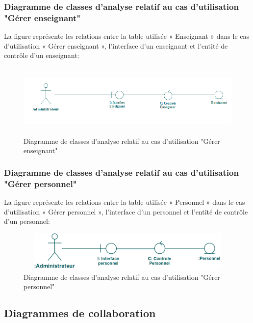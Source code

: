 \documentclass[12 pt]{report}
\begin{document}
\subsubsection{Diagramme de classes d’analyse relatif au cas d’utilisation "Gérer enseignant" }
La figure  représente les relations entre la table utilisée « Enseignant » dans le cas d’utilisation « Gérer enseignant », l’interface d'un enseignant et  l'entité de  contrôle d'un enseignant:
\begin{figure}[h]
\begin{center}
\includegraphics[width= 12cm , height =3.6cm]{cl_aj.png}
\caption{Diagramme de classes d’analyse relatif au cas d’utilisation "Gérer enseignant"}
\end{center}
\end{figure}
\subsubsection{Diagramme de classes d’analyse relatif au cas d’utilisation "Gérer personnel" }
La figure  représente les relations entre la table utilisée « Personnel » dans le cas d’utilisation « Gérer personnel », l’interface d'un personnel et  l'entité de  contrôle d'un personnel:
\begin{figure}[h]
\begin{center}
\includegraphics[width= 12cm , height =2cm]{cap.png}
\caption{Diagramme de classes d’analyse relatif au cas d’utilisation "Gérer personnel"}
\end{center}
\end{figure}
\subsection{Diagrammes de collaboration }
\end{document}
